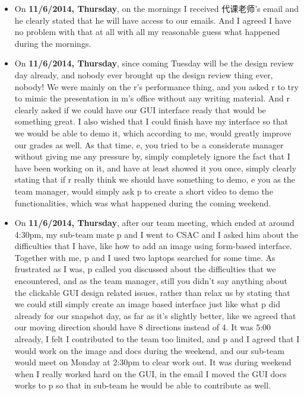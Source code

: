 \documentclass[12pt]{book}
\begin{document}
\begin{itemize}
\item On \textbf{11/6/2014, Thursday}, on the mornings I received 代课老师's email and he clearly stated that he will have access to our emails. And I agreed I have no problem with that at all with all my reasonable guess what happened during the mornings.

\item On \textbf{11/6/2014, Thursday}, since coming Tuesday will be the design review day already, and nobody ever brought up the design review thing ever, nobody! We were mainly on the r's performance thing, and you asked r to try to mimic the presentation in m's office without any writing material. And r clearly asked if we could have our GUI interface ready that would be something great. I also wished that I could finish have my interface so that we would be able to demo it, which according to me, would greatly improve our grades as well. As that time, e, you tried to be a considerate manager without giving me any pressure by, simply completely ignore the fact that I have been working on it, and have at least showed it you once, simply clearly stating that if r really think we should have something to demo, e you as the team manager, would simply ask p to create a short video to demo the functionalities, which was what happened during the coming weekend.

\item On \textbf{11/6/2014, Thursday}, after our team meeting, which ended at around 4:30pm, my sub-team mate p and I went to CSAC and I asked him about the difficulties that I have, like how to add an image using form-based interface. Together with me, p and I used two laptops searched for some time. As frustrated as I was, p called you discussed about the difficulties that we encountered, and as the team manager, still you didn't say anything about the clickable GUI design related issues, rather than relax us by stating that we could still simply create an image based interface just like what p did already for our snapshot day, as far as it's slightly better, like we agreed that our moving direction should have 8 directions instead of 4. It was 5:00 already, I felt I contributed to the team too limited, and p and I agreed that I would work on the image and docs during the weekend, and our sub-team would meet on Monday at 2:30pm to clear work out. It was during weekend when I really worked hard on the GUI, in the email I moved the GUI docs works to p so that in sub-team he would be able to contribute as well.


\end{itemize}
\end{document}
